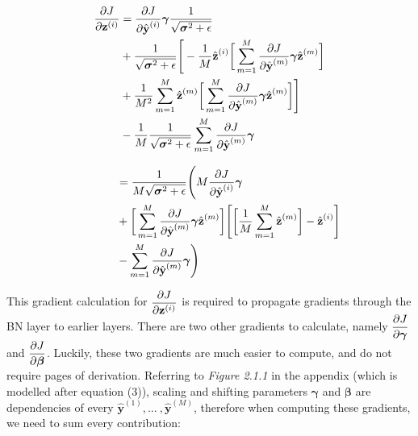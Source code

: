 \documentclass{article}
\begin{document}
\begin{multicols}{2}
\begin{equation}
    \begin{aligned}
        {\partial J \over \partial \textbf{z}^{(i)}}
        & = {\partial J \over \partial \hat{\textbf{y}}^{(i)}}
        \boldsymbol{\gamma} 
        {1 \over \sqrt{\boldsymbol{\sigma}^2 + \epsilon}} \\
        & + {1 \over \sqrt{\boldsymbol{\sigma}^2 + \epsilon}}\Bigg[-{1 \over M} \hat{\textbf{z}}^{(i)} \bigg[
            \sum_{m = 1}^M {\partial J \over \partial \hat{\textbf{y}}^{(m)}} 
            \boldsymbol{\gamma}
            \hat{\textbf{z}}^{(m)} \bigg]\\
        & +{1 \over M^2} \sum_{m=1}^M \hat{\textbf{z}}^{(m)}
            \bigg[
            \sum_{m = 1}^M {\partial J \over \partial \hat{\textbf{y}}^{(m)}} 
            \boldsymbol{\gamma}
            \hat{\textbf{z}}^{(m)}\bigg]\Bigg]\\
        & -{1\over M}{1 \over \sqrt{\boldsymbol{\sigma}^2 + \epsilon}}
        \sum_{m=1}^M {\partial J \over \partial \hat{\textbf{y}}^{(m)}}
        \boldsymbol{\gamma}\notag
    \end{aligned}
\end{equation}


\begin{equation}
    \begin{aligned}
        \ \ \ \ \ \ \ \ \ \  & = {1\over M\sqrt{\boldsymbol{\sigma}^2 + \epsilon}}\Bigg(M{\partial J  \over \partial \hat{\textbf{y}}^{(i)}}\boldsymbol{\gamma} \\
        & + \bigg[\sum_{m=1}^M{\partial J  \over \partial \hat{\textbf{y}}^{(m)}}\boldsymbol{\gamma}\hat{\textbf{z}}^{(m)}\bigg]
        \Bigg[\bigg[{1\over M}\sum_{m=1}^M\hat{\textbf{z}}^{(m)}\bigg] -  \hat{\textbf{z}}^{(i)}\Bigg] \\
        & - \sum_{m=1}^M{\partial J  \over \partial \hat{\textbf{y}}^{(m)}}\boldsymbol{\gamma}\Bigg)
    \end{aligned}
\end{equation}

This gradient calculation for $\begin{aligned}
    {\partial J \over \partial \textbf{z}^{(i)}}
\end{aligned}$ is required to propagate gradients through the BN layer to 
earlier layers. There are two other gradients to calculate, namely $\begin{aligned}
    {\partial J \over \partial \boldsymbol{\gamma}}
\end{aligned}$ and $\begin{aligned}
    {\partial J \over \partial \boldsymbol{\beta}}
\end{aligned}$. Luckily, these two gradients are much easier to compute, 
and do not require pages of derivation. Referring to \textit{Figure 2.1.1} in 
the appendix (which is modelled after equation (3)), scaling and shifting parameters
$\boldsymbol{\gamma}$ and $\boldsymbol{\beta}$ are dependencies of 
every $\hat{\textbf{y}}^{(1)}, ... \ , \hat{\textbf{y}}^{(M)} $, therefore when 
computing these gradients, we need to sum every contribution:


\end{multicols}
\end{document}
